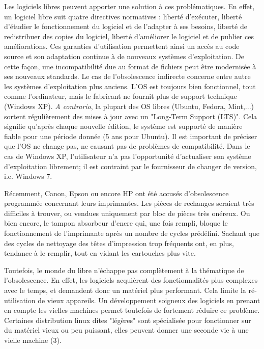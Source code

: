 \documentclass[10pt]{../fiche}
\begin{document}
Les logiciels libres peuvent apporter une solution à ces problématiques. En
effet, un logiciel libre suit quatre directives normatives : liberté
d'exécuter, liberté d'étudier le fonctionnement du logiciel et de l'adapter à
ses besoins, liberté de redistribuer des copies du logiciel, liberté
d'améliorer le logiciel et de publier ces améliorations. Ces garanties
d'utilisation permettent ainsi un accès au code source et son adaptation
continue à de nouveaux systèmes d'exploitation. De cette façon, une
incompatibilité due au format de fichiers peut être modernisée à ses nouveaux
standards. Le cas de l'obsolescence indirecte concerne entre autre les systèmes
d'exploitation plus anciens. L'OS est toujours bien fonctionnel, tout comme
l'ordinateur, mais le fabricant ne fournit plus de support technique
(\textsf{Windows XP}). \textit{A contrario}, la plupart des OS libres
(\textsf{Ubuntu, Fedora, Mint,...}) sortent régulièrement des mises à jour avec
un "Long-Term Support (LTS)". Cela signifie qu'après chaque nouvelle édition,
le système est supporté de manière fiable pour une période donnée (5 ans pour
\textsf{Ubuntu}). Il est important de préciser que l'OS ne change pas, ne
causant pas de problèmes de compatibilité. Dans le cas de \textsf{Windows XP},
l'utilisateur n'a pas l'opportunité d'actualiser son système d'exploitation
librement; il est contraint par le fournisseur de changer de version, i.e.
\textsf{Windows 7}.

Récemment, Canon, Epson ou encore HP ont été accusés d'obsolescence programmée
concernant leurs imprimantes. Les pièces de rechanges seraient très difficiles
à trouver, ou vendues uniquement par bloc de pièces très onéreux. Ou bien
encore, le tampon absorbeur d'encre qui, une fois rempli, bloque le
fonctionnement de l'imprimante après un nombre de cycles prédéfini. Sachant que
des cycles de nettoyage des têtes d'impression trop fréquents ont, en plus,
tendance à le remplir, tout en vidant les cartouches plus vite.

Toutefois, le monde du libre n'échappe pas complètement à la thématique de
l'obsolescence. En effet, les logiciels acquièrent des fonctionnalités plus
complexes avec le temps, et demandent donc un matériel plus performant. Cela
limite la ré-utilisation de vieux appareils. Un développement soigneux des
logiciels en prenant en compte les vielles machines permet toutefois de
fortement réduire ce problème. Certaines distribution linux dites "légères"
sont spécialisée pour fonctionner sur du matériel vieux ou peu puissant, elles peuvent donner une seconde vie à une vielle machine (3).
\end{document}
